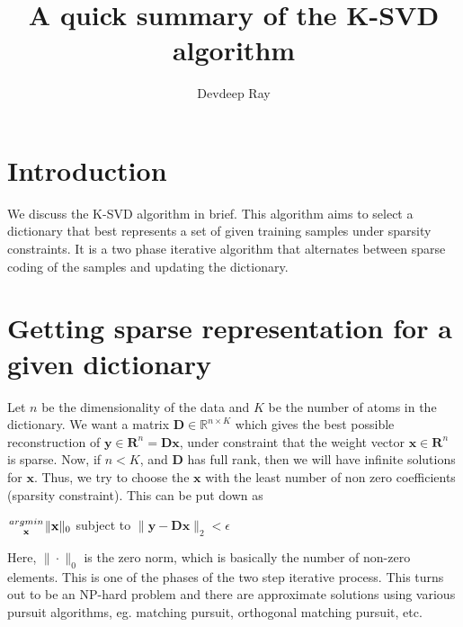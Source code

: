 \documentclass[10pt,a4paper,final]{article}
\title{A quick summary of the K-SVD algorithm}
\author{Devdeep Ray}
\begin{document}
\maketitle
\section{Introduction}
We discuss the K-SVD algorithm in brief. This algorithm aims to select a dictionary that best represents a set of given training samples under sparsity constraints. It is a two phase iterative algorithm that alternates between sparse coding of the samples and updating the dictionary.
\section{Getting sparse representation for a given dictionary}
Let $n$ be the dimensionality of the data and $K$ be the number of atoms in the dictionary. We want a matrix $\mathbf{D} \in \mathbb{R}^{n \times K}$ which gives the best possible reconstruction of $\mathbf{y} \in \mathbf{R}^n=\mathbf{Dx}$, under constraint that the weight vector $\mathbf{x} \in \mathbf{R}^n$ is sparse. Now, if $n < K$, and $\mathbf{D}$ has full rank, then we will have infinite solutions for $\mathbf{x}$. Thus, we try to choose the $\mathbf{x}$ with the least number of non zero coefficients (sparsity constraint). This can be put down as\\
\begin{center}
$\genfrac{}{}{0pt}{}{argmin}{\mathbf{x}}\|\mathbf{x}\|_0$ subject to $\|\mathbf{y} - \mathbf{Dx}\|_2 < \epsilon$ 
\end{center}
Here, $\|\cdot\|_0$ is the zero norm, which is basically the number of non-zero elements. This is one of the phases of the two step iterative process. This turns out to be an NP-hard problem and there are approximate solutions using various pursuit algorithms, eg. matching pursuit, orthogonal matching pursuit, etc.
\end{document}
